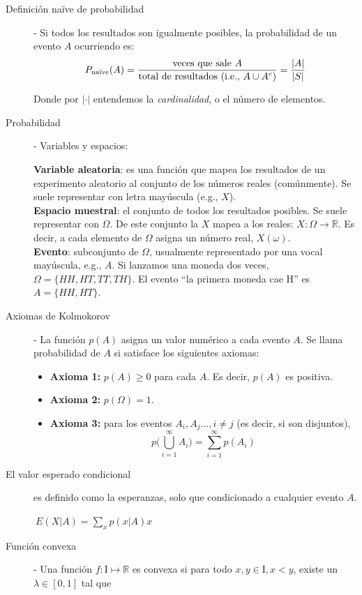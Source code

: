 \documentclass[12pt]{scrartcl}
\theoremstyle{definition}
\begin{document}
\begin{description}
	\item[Definición naïve de probabilidad] - {Si todos los resultados son igualmente posibles}, la probabilidad de un evento $A$ ocurriendo es:
	\[P_{\textrm{naïve}}(A) = \frac{\textnormal{veces que sale $A$}}{\textnormal{total de resultados (i.e., $A \cup A^c$})} = \frac{|A|}{|S|}\]
	
	Donde por $|\cdot|$ entendemos la \textit{cardinalidad}, o el número de elementos. 
	\item[Probabilidad] - Variables y espacios:
	
		\textbf{Variable aleatoria}: es una función que mapea los resultados de un experimento aleatorio al conjunto de los números reales (comúnmente). Se suele representar con letra mayúscula (e.g., $X$).\\
		\textbf{Espacio muestral}: el conjunto de todos los resultados posibles. Se suele representar con $\Omega$. De este conjunto la $X$ mapea a los reales: $X: \Omega \rightarrow \mathbb{R}$. Es decir, a cada elemento de $\Omega$ asigna un número real, $X(\omega)$.\\
		\textbf{Evento}: subconjunto de $\Omega$, usualmente representado por una vocal mayúscula, e.g., $A$. Si lanzamos una moneda dos veces, $\Omega = \{HH,HT,TT,TH\}$. El evento ``la primera moneda cae H'' es $A=\{HH,HT\}$. \\

		\item[Axiomas de Kolmokorov] - La función $p(A)$ asigna un valor numérico a cada evento $A$. Se llama probabilidad de $A$ si satisface los siguientes axiomas:
		\begin{itemize}
			\item \textbf{Axioma 1:} $p(A) \geq 0$ para cada $A$. Es decir, $p(A)$ es positiva.
			\item \textbf{Axioma 2:} $p(\Omega) = 1$.
			\item \textbf{Axioma 3:} para los eventos $A_i,A_j..., i \neq j$ (es decir, si son disjuntos), 
			\[p\Bigg (\bigcup^\infty_{i=1} A_i \Bigg) = \sum_{i=1}^{\infty} p(A_i)\]
		\end{itemize}
	
	\item[El valor esperado condicional] es definido como la esperanzas, solo que condicionado a cualquier evento $A$.
	\begin{center}
		$\ E(X | A) = \sum\limits_{x}p(x|A)x$
	\end{center}
	
	\item[Función convexa] - Una función $f\colon \mathrm{I} \mapsto \mathbb{R}$ es convexa si para todo $x, y \in \mathrm{I}, x < y$, existe un $\lambda \in [0, 1]$ tal que 
	

\end{description}
\end{document}
